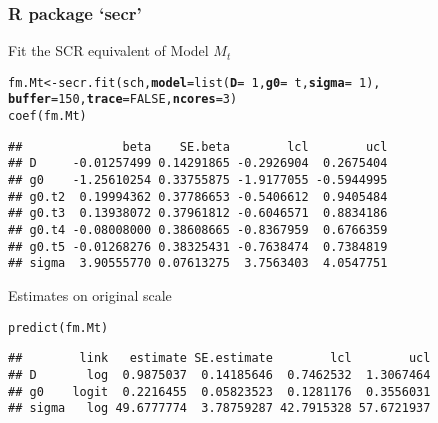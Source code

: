 \documentclass[color=usenames,dvipsnames]{beamer}\usepackage[]{graphicx}\usepackage[]{color}
\makeatletter
\newcommand{\hlnum}[1]{\textcolor[rgb]{0.69,0.494,0}{#1}}%
\newcommand{\hlopt}[1]{\textcolor[rgb]{0,0,0}{#1}}%
\newcommand{\hlstd}[1]{\textcolor[rgb]{0,0,0}{#1}}%
\newcommand{\hlkwb}[1]{\textcolor[rgb]{0,0.341,0.682}{#1}}%
\newcommand{\hlkwc}[1]{\textcolor[rgb]{0,0,0}{\textbf{#1}}}%
\newcommand{\hlkwd}[1]{\textcolor[rgb]{0.004,0.004,0.506}{#1}}%
\newenvironment{kframe}{%
 \def\at@end@of@kframe{}%
 \ifinner\ifhmode%
  \def\at@end@of@kframe{\end{minipage}}%
  \begin{minipage}{\columnwidth}%
 \fi\fi%
 \def\FrameCommand##1{\hskip\@totalleftmargin \hskip-\fboxsep
 \colorbox{shadecolor}{##1}\hskip-\fboxsep
     \hskip-\linewidth \hskip-\@totalleftmargin \hskip\columnwidth}%
 \MakeFramed {\advance\hsize-\width
   \@totalleftmargin\z@ \linewidth\hsize
   \@setminipage}}%
 {\par\unskip\endMakeFramed%
 \at@end@of@kframe}
\newenvironment{knitrout}{}{} %
\makeatother
\begin{document}
\begin{frame}[fragile]
  \frametitle{R package `secr'}
  Fit the SCR equivalent of Model $M_t$
\begin{knitrout}\scriptsize
{}\color{fgcolor}\begin{kframe}
\begin{alltt}
\hlstd{fm.Mt} \hlkwb{<-} \hlkwd{secr.fit}\hlstd{(sch,} \hlkwc{model}\hlstd{=}\hlkwd{list}\hlstd{(}\hlkwc{D}\hlstd{=}\hlopt{~}\hlnum{1}\hlstd{,} \hlkwc{g0}\hlstd{=}\hlopt{~}\hlstd{t,} \hlkwc{sigma}\hlstd{=}\hlopt{~}\hlnum{1}\hlstd{),}
                  \hlkwc{buffer}\hlstd{=}\hlnum{150}\hlstd{,} \hlkwc{trace}\hlstd{=}\hlnum{FALSE}\hlstd{,} \hlkwc{ncores}\hlstd{=}\hlnum{3}\hlstd{)}
\hlkwd{coef}\hlstd{(fm.Mt)}
\end{alltt}
\begin{verbatim}
##              beta    SE.beta        lcl        ucl
## D     -0.01257499 0.14291865 -0.2926904  0.2675404
## g0    -1.25610254 0.33755875 -1.9177055 -0.5944995
## g0.t2  0.19994362 0.37786653 -0.5406612  0.9405484
## g0.t3  0.13938072 0.37961812 -0.6046571  0.8834186
## g0.t4 -0.08008000 0.38608665 -0.8367959  0.6766359
## g0.t5 -0.01268276 0.38325431 -0.7638474  0.7384819
## sigma  3.90555770 0.07613275  3.7563403  4.0547751
\end{verbatim}
\end{kframe}
\end{knitrout}
\pause
\vfill
Estimates on original scale
\begin{knitrout}\scriptsize
{}\color{fgcolor}\begin{kframe}
\begin{alltt}
\hlkwd{predict}\hlstd{(fm.Mt)}
\end{alltt}
\begin{verbatim}
##        link   estimate SE.estimate        lcl        ucl
## D       log  0.9875037  0.14185646  0.7462532  1.3067464
## g0    logit  0.2216455  0.05823523  0.1281176  0.3556031
## sigma   log 49.6777774  3.78759287 42.7915328 57.6721937
\end{verbatim}
\end{kframe}
\end{knitrout}
\end{frame}
\end{document}
